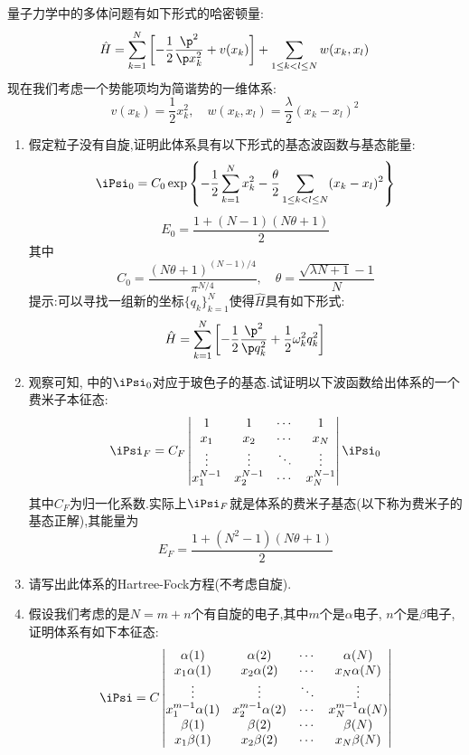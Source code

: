 \documentclass{ctexart}
\begin{document}
\begin{homework}[8.]
    量子力学中的多体问题有如下形式的哈密顿量:
    \[\hat{H}=\sum_{k=1}^{N}\left[-\dfrac{1}{2}\dfrac{\p^2}{\p x_k^2}+v(x_k)\right]+\sum_{1\leq k<l\leq N}w(x_k,x_l)\]
    现在我们考虑一个势能项均为简谐势的一维体系:
    \[v(x_k)=\dfrac{1}{2}x_k^2,\quad w(x_k,x_l)=\dfrac{\lambda}{2}(x_k-x_l)^2\]
    \begin{enumerate}[label=\tbf{(\alph*)}]
        \item 假定粒子没有自旋,证明此体系具有以下形式的基态波函数与基态能量:
        \[\iPsi_0=C_0\exp\left\{-\dfrac12\sum_{k=1}^{N}x_k^2-\dfrac{\theta}{2}\sum_{1\leq k<l\leq N}(x_k-x_l)^2\right\}\]
        \[E_0=\dfrac{1+(N-1)(N\theta+1)}{2}\]
        其中
        \[C_0=\dfrac{(N\theta+1)^{(N-1)/4}}{\pi^{N/4}},\quad\theta=\dfrac{\sqrt{\lambda N+1}-1}{N}\]
        提示:可以寻找一组新的坐标$\{q_k\}_{k=1}^{N}$使得$\hat{H}$具有如下形式:
        \[\hat{H}=\sum_{k=1}^{N}\left[-\dfrac{1}{2}\dfrac{\p^2}{\p q_k^2}+\dfrac{1}{2}\omega_k^2 q_k^2\right]\]
        \item 观察可知, 中的$\iPsi_0$对应于玻色子的基态.试证明以下波函数给出体系的一个费米子本征态:
        \[\iPsi_F=C_F\begin{vmatrix}
            1&1&\cdots&1\\
            x_1&x_2&\cdots&x_N\\
            \vdots&\vdots&\ddots&\vdots\\
            x_1^{N-1}&x_2^{N-1}&\cdots&x_{N}^{N-1}
        \end{vmatrix}\iPsi_0\]
        其中$C_F$为归一化系数.实际上$\iPsi_F$就是体系的费米子基态(以下称为费米子的基态正解),其能量为
        \[E_F=\dfrac{1+(N^2-1)(N\theta+1)}{2}\]
        \item 请写出此体系的Hartree-Fock方程(不考虑自旋).
        \item 假设我们考虑的是$N=m+n$个有自旋的电子,其中$m$个是$\alpha$电子, $n$个是$\beta$电子,证明体系有如下本征态:
        \[\iPsi=C\begin{vmatrix}
            \alpha(1)&\alpha(2)&\cdots&\alpha(N)\\
            x_1\alpha(1)&x_2\alpha(2)&\cdots&x_N\alpha(N)\\
            \vdots&\vdots&\ddots&\vdots\\
            x_1^{m-1}\alpha(1)&x_2^{m-1}\alpha(2)&\cdots&x_N^{m-1}\alpha(N)\\
            \beta(1)&\beta(2)&\cdots&\beta(N)\\
            x_1\beta(1)&x_2\beta(2)&\cdots&x_N\beta(N)\\

\end{vmatrix}\]
\end{enumerate}
\end{homework}
\end{document}

